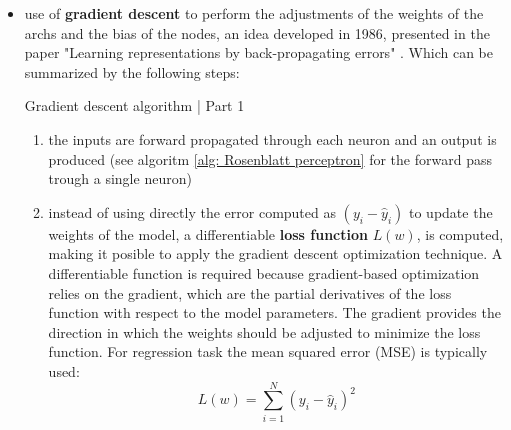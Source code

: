 \begin{itemize}
    \item use of \textbf{gradient descent} to perform the adjustments of the weights of the archs and the bias of the nodes, an idea developed in 1986, presented in the paper "Learning representations by back-propagating errors" \cite{rumelhart1986learning}. Which can be summarized by the following steps:
    
    \begin{tcolorbox} [colback=blue!5, colframe=blue!80, boxrule=0pt]
        \begin{algorithm} [H]
        \setcounter{algorithm}{4}
        \caption{Gradient descent algorithm | Part 1 }
        \label{alg: gradient descent}
        \begin{enumerate}
            \item  the inputs are forward propagated through each neuron and an output is produced (see algoritm \ref{alg: Rosenblatt perceptron} for the forward pass trough a single neuron)
            \item instead of using directly the error computed as $(y_i - \hat{y}_i)$ to update the weights of the model, a differentiable \textbf{loss function} $L(w)$, is computed, making it posible to apply the gradient descent optimization technique. A differentiable function is required because gradient-based optimization relies on the gradient, which are the partial derivatives of the loss function with respect to the model parameters. The gradient provides the direction in which the weights should be adjusted to minimize the loss function. For regression task the mean squared error (MSE) is typically used: 
            \[
            L(w) = \sum_{i=1}^{N} (y_i - \hat{y}_i)^2
            \]
        \end{enumerate}
        \end{algorithm}
    \end{tcolorbox}    

\newpage
    

\end{itemize}
